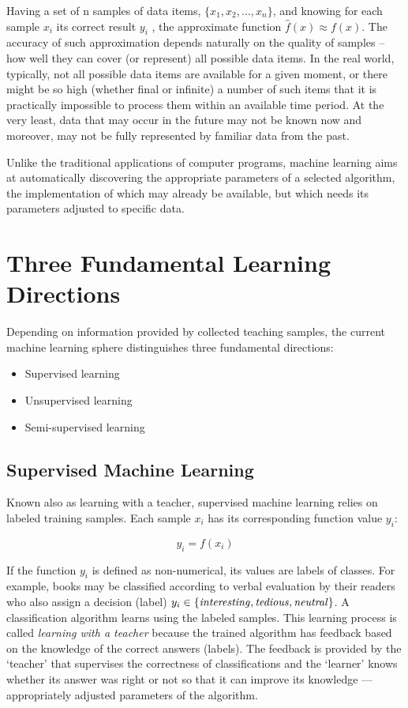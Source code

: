 Having a set of n samples of data items, $\{x_1, x_2, \dots, x_n\}$, and knowing for
each sample  $x_i$
its correct result $y_i$
, the approximate function $\hat{f}(x) \approx f(x)$. The
accuracy of such approximation depends naturally on the quality of samples –
how well they can cover (or represent) all possible data items. In the real world,
typically, not all possible data items are available for a given moment, or there might be so high (whether final or infinite) a number of such items that it is
practically impossible to process them within an available time period. At the
very least, data that may occur in the future may not be known now and moreover,
may not be fully represented by familiar data from the past.

Unlike the traditional applications of computer programs, machine learning
aims at automatically discovering the appropriate parameters of a selected algorithm, the implementation of which may already be available, but which needs
its parameters adjusted to specific data.

\section{Three Fundamental Learning Directions}

Depending on information provided by collected teaching samples, the current
machine learning sphere distinguishes three fundamental directions:

\begin{itemize}
    \item Supervised learning
    \item Unsupervised learning
    \item Semi-supervised learning
\end{itemize}

\subsection{ Supervised Machine Learning}

Known also as learning with a teacher, supervised machine learning relies on
labeled training samples. Each sample $x_i$ has its corresponding function value $y_i$:

\begin{equation*}
    y_i = f(x_i)
\end{equation*}

If the function $y_i$ is defined as non-numerical, its values are labels of classes.
For example, books may be classified according to verbal evaluation by their
readers who also assign a decision (label) $y_i \in \{\text{\textit{interesting}}, \text{\textit{tedious}}, \text{\textit{neutral}}\}$.
A classification algorithm learns using the labeled samples. This learning process
is called \emph{learning with a teacher} because the trained algorithm has feedback
based on the knowledge of the correct answers (labels). The feedback is provided
by the ‘teacher’ that supervises the correctness of classifications and the ‘learner’
knows whether its answer was right or not so that it can improve its knowledge —
appropriately adjusted parameters of the algorithm.

